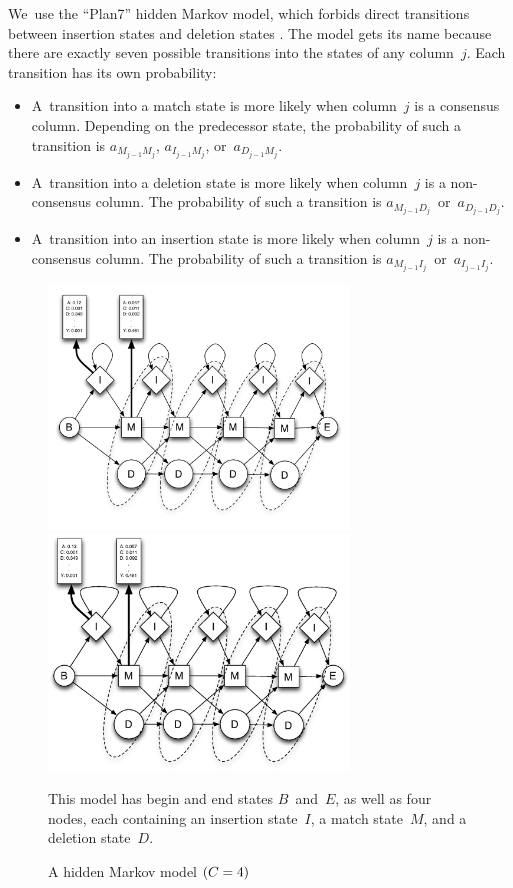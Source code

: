 \documentclass[nonatbib,preprint,blockstyle,times]{sigplanconf}
\newcommand\txprobj[3][]{a#1_{#2_{j-1}#3_j}}
\newcommand\txprobjj[3][]{a#1_{#2_{j-1}#3_j}}
\newcommand\alignwidth{\ensuremath C} %
\let\cite\citep
\begin{document}
We~use the ``Plan7'' hidden Markov model, which forbids direct
transitions between insertion 
states and deletion states \cite{Eddy:1998ut}. 
The model gets its name because there are exactly
seven possible transitions
into the states of any column~$j$.
Each transition has its own probability:
\begin{itemize} 
\item
A~transition into a match state 
is more likely when column~$j$ is a consensus column.
Depending on the predecessor state, 
the probability of such a transition is 
$\txprobj M M$, $\txprobj I M$, or~$\txprobj D M$.
\item
A~transition into a deletion state 
is more likely when column~$j$ is a non-consensus column.
The probability of such a transition is 
$\txprobj M D$~or~$\txprobj D D$.
\item
A~transition into an insertion state 
is more likely when column~$j$ is a non-consensus column.
The probability of such a transition is 
$\txprobjj M I$~or~$\txprobjj I I$.
\end{itemize}



\begin{figure} 
\ifpdfmadness
\centerline{\includegraphics[width=8cm]{Plan7.pdf}} 
\else
\centerline{\includegraphics[width=8cm]{Plan7.eps}} 
\fi


This model
has begin and end states $B$~and~$E$,
as well as four
nodes, each containing 
an insertion state~$I$, 
a match state~$M$, and a
deletion state~$D$.

\caption{A hidden Markov model $(\alignwidth = 4)$}

\label{plan7} \end{figure}
\end{document}
